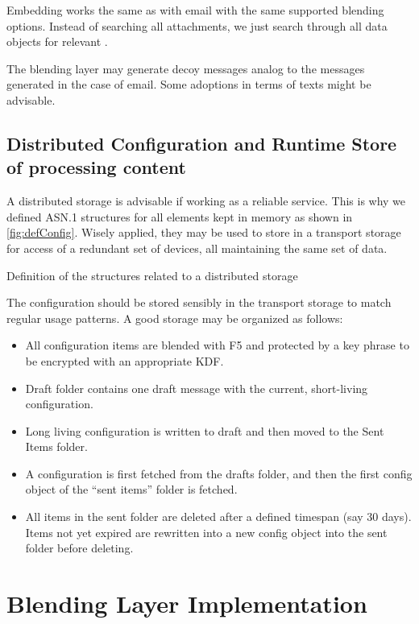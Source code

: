 Embedding works the same as with email with the same supported blending options. Instead of searching all attachments, we just search through all data objects for relevant \VortexMessages.

The blending layer may generate decoy messages analog to the messages generated in the case of email. Some adoptions in terms of texts might be advisable.

\section{Distributed Configuration and Runtime Store of processing content}
A distributed storage is advisable if working as a reliable service. This is why we defined ASN.1 structures for all elements kept in memory as shown in \cref{fig:defConfig}. Wisely applied, they may be used to store in a transport storage for access of a redundant set of devices, all maintaining the same set of data. 

\begin{lstfloat}[ht]
	
	\caption{Definition of the structures related to a distributed storage}
	\label{fig:defConfig}
\end{lstfloat}

The configuration should be stored sensibly in the transport storage to match regular usage patterns. A good storage may be organized as follows:
\begin{itemize}
	\item All configuration items are blended with F5 and protected by a key phrase to be encrypted with an appropriate KDF.
	\item Draft folder contains one draft message with the current, short-living configuration. 
	\item Long living configuration is written to draft and then moved to the Sent Items folder.
	\item A configuration is first fetched from the drafts folder, and then the first config object of the ``sent items'' folder is fetched.
	\item All items in the sent folder are deleted after a defined timespan (say 30 days). Items not yet expired are rewritten into a new config object into the sent folder before deleting. 
\end{itemize}


\chapter{Blending Layer Implementation}\label{sec:blendingImplementation}
